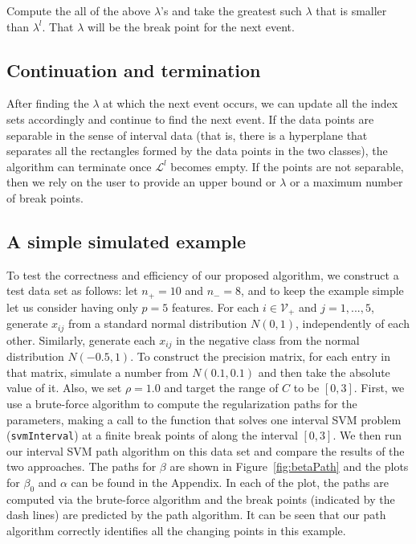 \documentclass[10pt]{article}
\theoremstyle{definition}
\begin{document}
Compute the all of the above $\lambda$'s and take the greatest such $\lambda$ that is smaller than $\lambda^l$. That $\lambda$ will be the break point for the next event. 

\subsection{Continuation and termination}
After finding the $\lambda$ at which the next event occurs, we can update all the index sets accordingly and continue to find the next event. If the data points are separable in the sense of interval data (that is, there is a hyperplane that separates all the rectangles formed by the data points in the two classes), the algorithm can terminate once $\mathcal L^l$ becomes empty. If the points are not separable, then we rely on the user to provide an upper bound or $\lambda$ or a maximum number of break points.

\subsection{A simple simulated example}
To test the correctness and efficiency of our proposed algorithm, we construct a test data set as follows: let $n_+=10$ and $n_-=8$, and to keep the example simple let us consider having only $p=5$ features. For each $i\in\mathcal V_+$ and $j=1,...,5$, generate $x_{ij}$ from a standard normal distribution $N(0,1)$, independently of each other. Similarly, generate each $x_{ij}$ in the negative class from the normal distribution $N(-0.5,1)$. To construct the precision matrix, for each entry in that matrix, simulate a number from $N(0.1,0.1)$ and then take the absolute value of it. Also, we set $\rho = 1.0$ and target the range of $C$ to be $[0,3]$. First, we use a brute-force algorithm to compute the regularization paths for the parameters, making a call to the function that solves one interval SVM problem ({\tt svmInterval}) at a finite break points of along the interval $[0,3]$. We then run our interval SVM path algorithm on this data set and compare the results of the two approaches. The paths for $\beta$ are shown in Figure~\ref{fig:betaPath} and the plots for $\beta_0$ and $\alpha$ can be found in the Appendix. In each of the plot, the paths are computed via the brute-force algorithm and the break points (indicated by the dash lines) are predicted by the path algorithm. It can be seen that our path algorithm correctly identifies all the changing points in this example.
\end{document}
